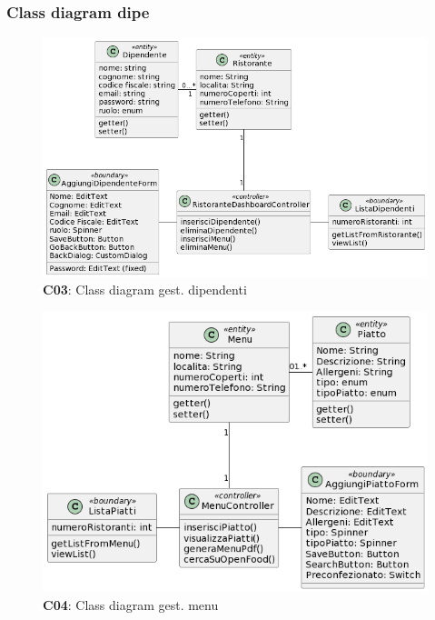     \subsubsection{Class diagram dipe}
        \begin{figure}[H]
            \centering
            \includegraphics[scale=0.5]{assets/diagrammi/Class diagram di analisi/Gestione dipendenti.png}
            \caption{\textbf{C03}: Class diagram gest. dipendenti}\label{fig:Dipendenti}
        \end{figure}

    \begin{figure}[H]
        \centering
        \includegraphics[scale=0.5]{assets/diagrammi/Class diagram di analisi/Gestione menu.png}
        \caption{\textbf{C04}: Class diagram gest. menu}\label{fig:Menu}
    \end{figure}

